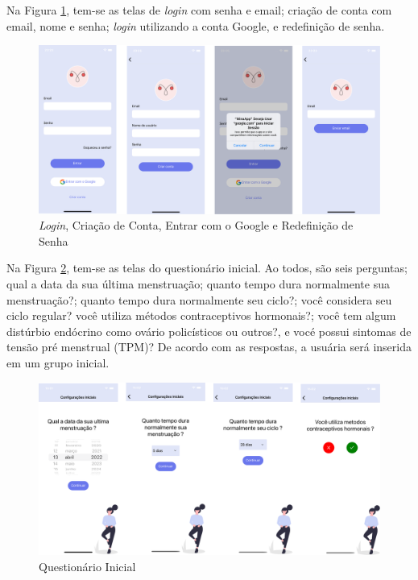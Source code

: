 Na Figura \ref{fig19}, tem-se as telas de \emph{login} com senha e email; criação de conta com email, nome e senha; 
\emph{login} utilizando a conta Google, e redefinição de senha.

\begin{figure}[ht]
	\caption{\emph{Login}, Criação de Conta, Entrar com o Google e Redefinição de Senha}
	\begin{center}
	\includegraphics[keepaspectratio=true,scale=0.08]{figuras/aplicativo1.png}
	\end{center}
    \label{fig19}
\end{figure}

Na Figura \ref{fig20}, tem-se as telas do questionário inicial. Ao todos, são seis perguntas; qual a data da sua 
última menstruação; quanto tempo dura normalmente sua menstruação?; quanto tempo dura normalmente seu ciclo?;
você considera seu ciclo regular? você utiliza métodos contraceptivos hormonais?; você tem algum distúrbio 
endócrino como ovário policísticos ou outros?, e vocé possui sintomas de tensão pré menstrual (TPM)? 
De acordo com as respostas, a usuária será inserida em um grupo inicial.

\begin{figure}[ht]
	\caption{Questionário Inicial}
	\begin{center}
	\includegraphics[keepaspectratio=true,scale=0.08]{figuras/aplicativo4.png}
	\end{center}
    \label{fig20}
\end{figure}

